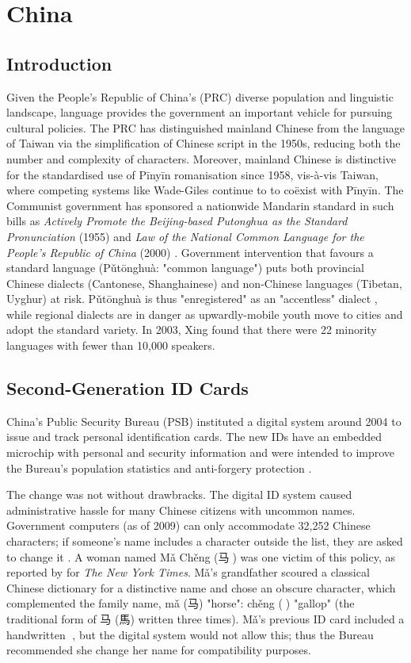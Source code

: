 \section{China}

\subsection{Introduction}

Given the People's Republic of China's (PRC) diverse population and linguistic
landscape, language provides the government an important vehicle for pursuing
cultural policies. The PRC has distinguished mainland Chinese from the language of
Taiwan via the simplification of Chinese script in the 1950s, reducing both the
number and complexity of characters. Moreover, mainland Chinese is distinctive
for the standardised use of Pīnyīn romanisation since 1958, vis-à-vis Taiwan,
where competing systems like Wade-Giles continue to to coëxist with Pīnyīn.  The
Communist government has sponsored a nationwide Mandarin standard in such bills
as \textit{Actively Promote the Beijing-based Putonghua as the Standard
Pronunciation} (1955) and \textit{Law of the National Common Language for the
People’s Republic of China} (2000) \parencite{dong10}. Government intervention
that favours a standard language (Pǔtōnghuà: "common language") puts both
provincial Chinese dialects (Cantonese, Shanghainese) and non-Chinese languages
(Tibetan, Uyghur) at risk. Pǔtōnghuà is thus "enregistered" as an "accentless"
dialect \parencite{dong10}, while regional dialects are in danger as
upwardly-mobile youth move to cities and adopt the standard variety. In 2003,
Xing found that there were 22 minority languages with fewer than 10,000
speakers.

\subsection{Second-Generation ID Cards}

China's Public Security Bureau (PSB) instituted a digital system around 2004 to
issue and track personal identification cards. The new IDs have an embedded
microchip with personal and security information and were intended to improve
the Bureau's population statistics and anti-forgery protection
\parencite{ciicn04}.

The change was not without drawbracks. The digital ID system caused
administrative hassle for many Chinese citizens with uncommon names. Government
computers (as of 2009) can only accommodate 32,252 Chinese characters; if
someone's name includes a character outside the list, they are asked to change
it \parencite{lafraniere09}. A woman named Mǎ Chěng ({\zafont 马}{\zbfont 𩧢})
was one victim of this policy, as reported by \textcite{lafraniere09} for
\textit{The New York Times}. Mǎ's grandfather scoured a classical Chinese
dictionary for a distinctive name and chose an obscure character, which
complemented the family name, mǎ ({\zafont 马}) "horse": chěng ({\zbfont 𩧢})
"gallop" (the traditional form of {\zafont 马} ({\zafont 馬}) written three
times). Mǎ's previous ID card included a handwritten {\zbfont 𩧢}, but the
digital system would not allow this; thus the Bureau recommended she change her
name for compatibility purposes.

